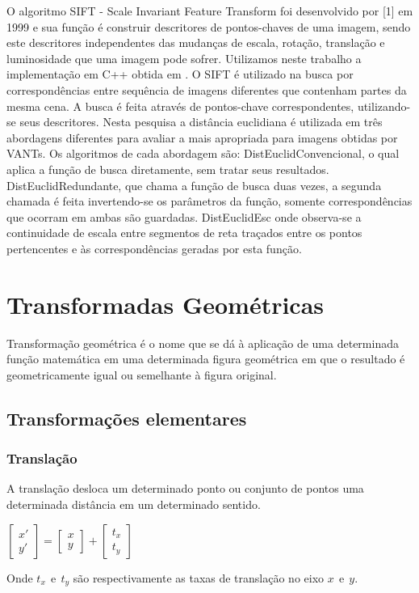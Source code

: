\documentclass[9pt, a4paper, nofonttune, journal]{IEEEtran}
\begin{document}
O algoritmo SIFT - Scale Invariant Feature Transform foi desenvolvido por [1] em 1999 e sua função é construir descritores de pontos-chaves de uma imagem, sendo este descritores independentes das mudanças de escala, rotação, translação e luminosidade que uma imagem pode sofrer. Utilizamos neste trabalho a implementação em C++ obtida em \cite{vedaldi}.
O SIFT é utilizado na busca por correspondências entre sequência de imagens diferentes que contenham partes da mesma cena. A busca é feita através de pontos-chave correspondentes, utilizando-se seus descritores. Nesta pesquisa a distância euclidiana é utilizada em três abordagens diferentes para avaliar a mais apropriada para imagens obtidas por VANTs. Os algoritmos de cada abordagem são: DistEuclidConvencional, o qual aplica a função de busca diretamente, sem tratar seus resultados. DistEuclidRedundante, que chama a função de busca duas vezes, a segunda chamada é feita invertendo-se os parâmetros da função, somente correspondências que ocorram em ambas são guardadas. DistEuclidEsc onde observa-se a continuidade de escala entre segmentos de reta traçados entre os pontos pertencentes e às correspondências geradas por esta função.


\clearpage

\section{Transformadas Geométricas}
\PARstart Transformação geométrica é o nome que se dá à aplicação de uma determinada função matemática em uma determinada figura geométrica 
em que o resultado é geometricamente igual ou semelhante à figura original.

\subsection{Transformações elementares}
\subsubsection{Translação}
A translação desloca um determinado ponto ou conjunto de pontos uma determinada distância em um determinado sentido.

\begin{center}
$\begin{bmatrix}x'\\
y'
\end{bmatrix}=\begin{bmatrix}x\\
y
\end{bmatrix}+\begin{bmatrix}t_{x}\\
t_{y}
\end{bmatrix}$\end{center}
Onde $t_{x}~~ \textrm{e} ~~ t_{y}$ são respectivamente as taxas de translação no eixo $x~~ \textrm{e} ~~y$.\cite{CGPPBook1}
\end{document}
